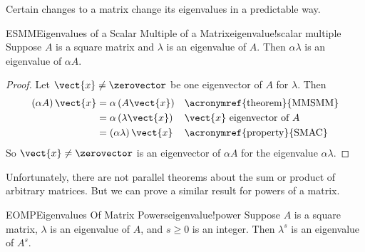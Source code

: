 %
%
Certain changes to a matrix change its eigenvalues in a predictable way.
%
\begin{theorem}{ESMM}{Eigenvalues of a Scalar Multiple of a Matrix}{eigenvalue!scalar multiple}
Suppose $A$ is a square matrix and $\lambda$ is an eigenvalue of $A$.  Then $\alpha\lambda$ is an eigenvalue of $\alpha A$.
\end{theorem}
%
\begin{proof}
%
Let $\vect{x}\neq\zerovector$ be one eigenvector of $A$ for $\lambda$.  Then
%
\begin{align*}
\left(\alpha A\right)\vect{x}&=\alpha\left(A\vect{x}\right)&&\text{\acronymref{theorem}{MMSMM}}\\
&=\alpha\left(\lambda\vect{x}\right)&&\text{$\vect{x}$ eigenvector of $A$}\\
&=\left(\alpha\lambda\right)\vect{x}&&\text{\acronymref{property}{SMAC}}
\end{align*}
%
So $\vect{x}\neq\zerovector$ is an eigenvector of $\alpha A$ for the eigenvalue $\alpha\lambda$.
\end{proof}
%
Unfortunately, there are not parallel theorems about the sum or product of arbitrary matrices.  But we can prove a similar result for powers of a matrix.
%
\begin{theorem}{EOMP}{Eigenvalues Of Matrix Powers}{eigenvalue!power}
Suppose $A$ is a square matrix, $\lambda$ is an eigenvalue of $A$, and $s\geq 0$ is an integer.  Then $\lambda^s$ is an eigenvalue of $A^s$.
\end{theorem}
%
